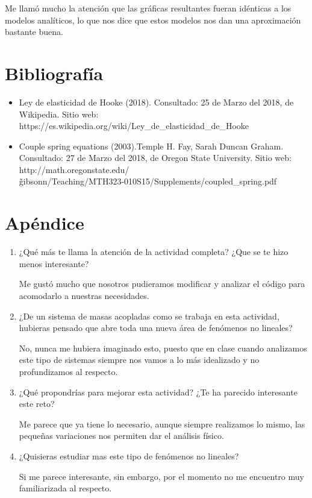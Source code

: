 \documentclass[12pt]{article}
\begin{document}
Me llamó mucho la atención que las gráficas resultantes fueran idénticas a los modelos analíticos, lo que nos dice que estos modelos nos dan una aproximación bastante buena.

\section{Bibliografía}

\begin{itemize}
\item Ley de elasticidad de Hooke (2018). Consultado: 25 de Marzo del 2018, de Wikipedia. Sitio web: https://es.wikipedia.org/wiki/Ley\_de\_elasticidad\_de\_Hooke
\item Couple spring equations (2003).Temple H. Fay, Sarah Duncan Graham. Consultado: 27 de Marzo del 2018, de Oregon State University. Sitio web:  http://math.oregonstate.edu/\\
\~gibsonn/Teaching/MTH323-010S15/Supplements/coupled\_spring.pdf
\end{itemize}

\section{Apéndice}

\begin{enumerate}
\item ¿Qué más te llama la atención de la actividad completa? ¿Que se te hizo menos interesante?

Me gustó mucho que nosotros pudieramos modificar y analizar el código para acomodarlo a nuestras necesidades.

\item ¿De un sistema de masas acopladas como se trabaja en esta actividad, hubieras pensado que abre toda una nueva área de fenómenos no lineales?

No, nunca me hubiera imaginado esto, puesto que en clase cuando analizamos este tipo de sistemas siempre nos vamos a lo más idealizado y no profundizamos al respecto.

\item ¿Qué propondrías para mejorar esta actividad? ¿Te ha parecido interesante este reto?

Me parece que ya tiene lo necesario, aunque siempre realizamos lo mismo, las pequeñas variaciones nos permiten dar el análisis físico.

\item ¿Quisieras estudiar mas este tipo de fenómenos no lineales?

Si me parece interesante, sin embargo, por el momento no me encuentro muy familiarizada al respecto.

\end{enumerate}
\end{document}

